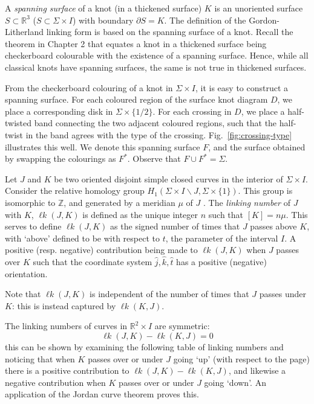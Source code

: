 \documentclass[12pt]{report}
\newcommand{\R}{\mathbb{R}}
\newcommand{\Z}{\mathbb{Z}}
\newcommand{\lk}{\operatorname{\ell\textit{k}}}
\begin{document}
A \textit{spanning surface} of a knot (in a thickened surface) $K$ is an unoriented surface $S \subset \R^{3}$ ($S \subset \Sigma \times I$) with boundary $\partial S = K$. The definition of the Gordon-Litherland linking form is based on the spanning surface of a knot. Recall the theorem in Chapter 2 that equates a knot in a thickened surface being checkerboard colourable with the existence of a spanning surface. Hence, while all classical knots have spanning surfaces, the same is not true in thickened surfaces.

From the checkerboard colouring of a knot in $\Sigma \times I$, it is easy to construct a spanning surface. For each coloured region of the surface knot diagram $D$, we place a corresponding disk in $\Sigma \times \{1/2\}$. For each crossing in $D$, we place a half-twisted band connecting the two adjacent coloured regions, such that the half-twist in the band agrees with the type of the crossing. Fig.~\ref{fig:crossing-type} illustrates this well. We denote this spanning surface $F$, and the surface obtained by swapping the colourings as $F^{*}$. Observe that $F \cup F^{*} = \Sigma$.

Let $J$ and $K$ be two oriented disjoint simple closed curves in the interior of $\Sigma \times I$. Consider the relative homology group $H_{1}(\Sigma \times I \smallsetminus J, \Sigma \times \{1\})$. This group is isomorphic to $\Z$, and generated by a meridian $\mu$ of $J$ \cite{virtual-knot-groups-almost-classical-knots}. The \textit{linking number} of $J$ with $K$, $\lk(J, K)$ is defined as the unique integer $n$ such that $[K] = n\mu$. This serves to define $\lk(J, K)$ as the signed number of times that $J$ passes above $K$, with `above' defined to be with respect to $t$, the parameter of the interval $I$. A positive (resp. negative) contribution being made to $\lk(J, K)$ when $J$ passes over $K$ such that the coordinate system $\hat{j}, \hat{k}, \hat{t}$ has a positive (negative) orientation.

Note that $\lk(J, K)$ is independent of the number of times that $J$ passes under $K$: this is instead captured by $\lk(K, J)$.

The linking numbers of curves in $\R^{2} \times I$ are symmetric:
\[\lk(J, K) - \lk(K, J) = 0\]
this can be shown by examining the following table of linking numbers and noticing that when $K$ passes over or under $J$ going `up' (with respect to the page) there is a positive contribution to $\lk(J, K) - \lk(K, J)$, and likewise a negative contribution when $K$ passes over or under $J$ going `down'. An application of the Jordan curve theorem proves this.
\end{document}
